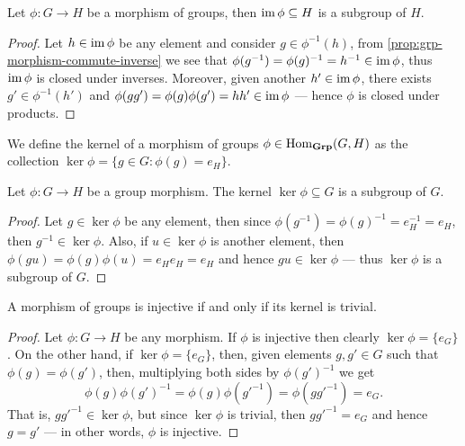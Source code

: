 \begin{proposition}
\label{prop:morphism-image-subgroup}
Let \(\phi: G \to H\) be a morphism of groups, then \(\operatorname{im} \phi \subseteq H\) is
a subgroup of \(H\).
\end{proposition}

\begin{proof}
Let \(h \in \operatorname{im} \phi\) be any element and consider \(g \in \phi^{-1}(h)\), from
\cref{prop:grp-morphism-commute-inverse} we see that \(\phi(g^{-1}) =
\phi(g)^{-1} = h^{-1} \in \operatorname{im} \phi\), thus \(\operatorname{im} \phi\) is closed under
inverses. Moreover, given another \(h' \in \operatorname{im} \phi\), there exists \(g' \in
\phi^{-1}(h')\) and \(\phi(g g') = \phi(g) \phi(g') = h h' \in \operatorname{im} \phi\) ---
hence \(\phi\) is closed under products.
\end{proof}

\begin{definition}[Kernel]
We define the kernel of a morphism of groups \(\phi \in \operatorname{Hom}_{\textbf{Grp}}(G, H)\) as
the collection \(\ker \phi = \{g \in G: \phi(g) = e_H\}\).
\end{definition}

\begin{lemma}
\label{lem:kernel-subgroup}
Let \(\phi: G \to H\) be a group morphism. The kernel \(\ker \phi \subseteq G\)
is a subgroup of \(G\).
\end{lemma}

\begin{proof}
Let \(g \in \ker \phi\) be any element, then since \(\phi(g^{-1}) = \phi(g)^{-1}
= e_H^{-1} = e_H\), then \(g^{-1} \in \ker \phi\). Also, if \(u \in \ker \phi\)
is another element, then \(\phi(g u) = \phi(g) \phi(u) = e_H e_H = e_H\) and
hence \(g u \in \ker \phi\) --- thus \(\ker \phi\) is a subgroup of \(G\).
\end{proof}

\begin{proposition}\label{prop: ker-trivial-inj}
A morphism of groups is injective if and only if its kernel is trivial.
\end{proposition}

\begin{proof}
Let \(\phi: G \to H\) be any morphism. If \(\phi\) is injective then clearly
\(\ker\phi = \{e_G\}\). On the other hand, if \(\ker\phi = \{e_G\}\), then,
given elements \(g, g' \in G\) such that \(\phi(g) = \phi(g')\), then,
multiplying both sides by \(\phi{(g')}^{-1}\) we get
\[
  \phi(g) {\phi(g')}^{-1} = \phi(g) \phi(g'^{-1}) = \phi(gg'^{-1}) = e_G.
\]
That is, \(gg'^{-1} \in \ker\phi\), but since \(\ker\phi\) is trivial, then
\(gg'^{-1} = e_G\) and hence \(g = g'\) --- in other words, \(\phi\) is
injective.
\end{proof}

